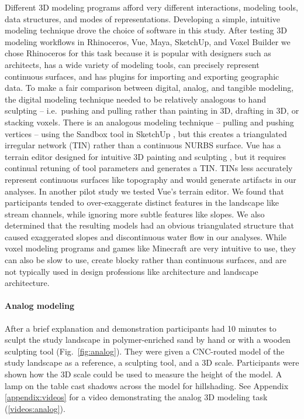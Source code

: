 \documentclass[prodmode,acmtochi]{acmsmall} %
\begin{document}
Different 3D modeling programs afford very different
interactions, modeling tools, data structures, and modes of representations. 
%
Developing a simple, intuitive modeling technique 
drove the choice of software in this study. 
%
After testing 3D modeling workflows in 
Rhinoceros, Vue, Maya, SketchUp, and Voxel Builder
we chose Rhinoceros for this task because it 
is popular with designers such as architects, 
has a wide variety of modeling tools,
can precisely represent continuous surfaces, 
and has plugins for importing and exporting geographic data. 
%
To make a fair comparison between digital, analog, and tangible modeling,
the digital modeling technique needed to be relatively analogous to hand sculpting
-- i.e.~pushing and pulling rather than painting in 3D, drafting in 3D, or stacking voxels.
%
There is an analogous modeling technique -- pulling and pushing vertices -- 
using the Sandbox tool in SketchUp \cite{SketchUp},
but this creates a triangulated irregular network (TIN)
rather than a continuous NURBS surface. 
%
Vue has a terrain editor designed for intuitive 3D painting and sculpting \cite{Vue},
but it requires continual retuning of tool parameters
and generates a TIN. 
%
TINs less accurately represent continuous surfaces like topography
and would generate artifacts in our analyses. 
%
In another pilot study \cite{Harmon2016} we tested Vue's terrain editor. 
We found that participants tended to 
over-exaggerate distinct features in the landscape like stream channels, 
while ignoring more subtle features like slopes.  
We also determined that the resulting models
had an obvious triangulated structure that caused
exaggerated slopes and discontinuous water flow 
in our analyses. 
%
While voxel modeling programs 
and games like Minecraft \cite{Minecraft}
are very intuitive to use,
they can also be slow to use,
create blocky rather than
continuous surfaces, 
and are not typically used in design professions 
like architecture and landscape architecture.

\paragraph{Analog modeling}

After a brief explanation and demonstration
participants had 10 minutes to sculpt the study landscape in polymer-enriched sand 
by hand or with a wooden sculpting tool (Fig.~\ref{fig:analog}).  
They were given a CNC-routed model of the study landscape 
as a reference, a sculpting tool, and a 3D scale. 
Participants were shown how the 3D scale could be used to 
measure the height of the model. 
A lamp on the table cast shadows across the model for hillshading.
%
See Appendix \ref{appendix:videos}
for a video demonstrating the analog 3D modeling task (\ref{videos:analog}).
\end{document}

